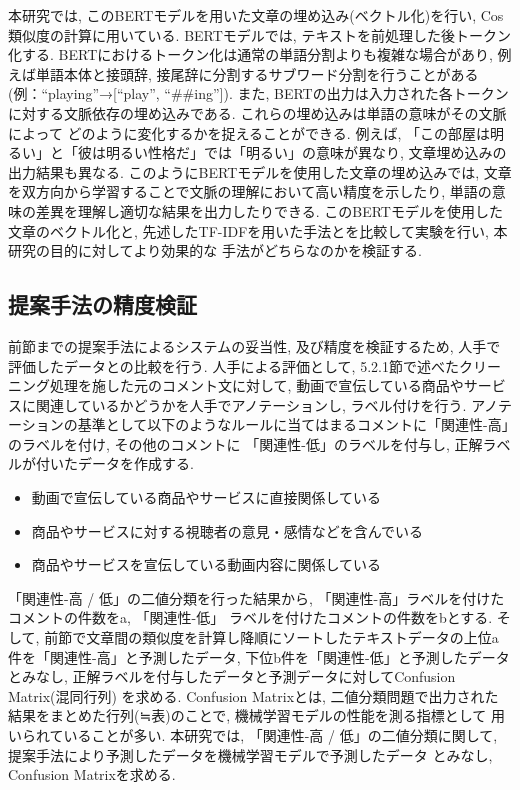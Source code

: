 \documentclass{ltjarticle}
\begin{document}
本研究では, このBERTモデルを用いた文章の埋め込み(ベクトル化)を行い, Cos類似度の計算に用いている. 
BERTモデルでは, テキストを前処理した後トークン化する. BERTにおけるトークン化は通常の単語分割よりも複雑な場合があり, 
例えば単語本体と接頭辞, 接尾辞に分割するサブワード分割を行うことがある(例：``playing''→[``play'', ``\#\#ing'']). 
また, BERTの出力は入力された各トークンに対する文脈依存の埋め込みである. これらの埋め込みは単語の意味がその文脈によって
どのように変化するかを捉えることができる. 例えば, 「この部屋は明るい」と「彼は明るい性格だ」では「明るい」の意味が異なり, 
文章埋め込みの出力結果も異なる. 
このようにBERTモデルを使用した文章の埋め込みでは, 文章を双方向から学習することで文脈の理解において高い精度を示したり, 
単語の意味の差異を理解し適切な結果を出力したりできる. 
このBERTモデルを使用した文章のベクトル化と, 先述したTF-IDFを用いた手法とを比較して実験を行い, 本研究の目的に対してより効果的な
手法がどちらなのかを検証する. 
\vspace{30truept}

\subsection{提案手法の精度検証}
前節までの提案手法によるシステムの妥当性, 及び精度を検証するため, 人手で評価したデータとの比較を行う. 
人手による評価として, 5.2.1節で述べたクリーニング処理を施した元のコメント文に対して, 
動画で宣伝している商品やサービスに関連しているかどうかを人手でアノテーションし, ラベル付けを行う. 
アノテーションの基準として以下のようなルールに当てはまるコメントに「関連性-高」のラベルを付け, その他のコメントに
「関連性-低」のラベルを付与し, 正解ラベルが付いたデータを作成する. 
\vspace{10truept}

\begin{itemize}
    \item 動画で宣伝している商品やサービスに直接関係している
    \item 商品やサービスに対する視聴者の意見・感情などを含んでいる
    \item 商品やサービスを宣伝している動画内容に関係している
\end{itemize}
\vspace{10truept}


「関連性-高 / 低」の二値分類を行った結果から, 「関連性-高」ラベルを付けたコメントの件数をa, 「関連性-低」
ラベルを付けたコメントの件数をbとする. 
そして, 前節で文章間の類似度を計算し降順にソートしたテキストデータの上位a件を「関連性-高」と予測したデータ, 
下位b件を「関連性-低」と予測したデータとみなし, 正解ラベルを付与したデータと予測データに対してConfusion Matrix(混同行列)
を求める. Confusion Matrixとは, 二値分類問題で出力された結果をまとめた行列(≒表)のことで, 機械学習モデルの性能を測る指標として
用いられていることが多い. 本研究では, 「関連性-高 / 低」の二値分類に関して, 提案手法により予測したデータを機械学習モデルで予測したデータ
とみなし, Confusion Matrixを求める. 
\end{document}
